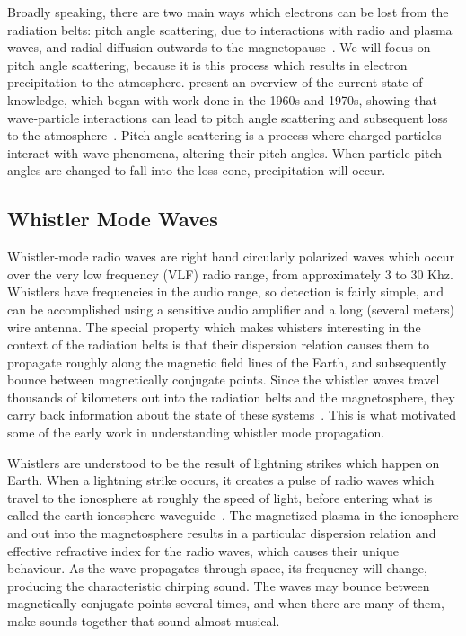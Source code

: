 Broadly speaking, there are two main ways which electrons can be lost from the radiation belts: pitch angle scattering, due to interactions with radio and plasma waves, and radial diffusion outwards to the magnetopause~\citep{cao2017}. We will focus on pitch angle scattering, because it is this process which results in electron precipitation to the atmosphere. \cite{Millan2007a} present an overview of the current state of knowledge, which began with work done in the 1960s and 1970s, showing that wave-particle interactions can lead to pitch angle scattering and subsequent loss to the atmosphere~\citep{kennel1966, thorne1971, thorne1974}. Pitch angle scattering is a process where charged particles interact with wave phenomena, altering their pitch angles. When particle pitch angles are changed to fall into the loss cone, precipitation will occur. 


\subsection{Whistler Mode Waves}

Whistler-mode radio waves are right hand circularly polarized waves which occur over the very low frequency (VLF) radio range, from approximately 3 to 30 Khz. Whistlers have frequencies in the audio range, so detection is fairly simple, and can be accomplished using a sensitive audio amplifier and a long (several meters) wire antenna. The special property which makes whisters interesting in the context of the radiation belts is that their dispersion relation causes them to propagate roughly along the magnetic field lines of the Earth, and subsequently bounce between magnetically conjugate points. Since the whistler waves travel thousands of kilometers out into the radiation belts and the magnetosphere, they carry back information about the state of these systems~\citep{ratcliffe66}. This is what motivated some of the early work in understanding whistler mode propagation. 

Whistlers are understood to be the result of lightning strikes which happen on Earth. When a lightning strike occurs, it creates a pulse of radio waves which travel to the ionosphere at roughly the speed of light, before entering what is called the earth-ionosphere waveguide~\cite{ratcliffe66}. The magnetized plasma in the ionosphere and out into the magnetosphere results in a particular dispersion relation and effective refractive index for the radio waves, which causes their unique behaviour. As the wave propagates through space, its frequency will change, producing the characteristic chirping sound. The waves may bounce between magnetically conjugate points several times, and when there are many of them, make sounds together that sound almost musical. 

